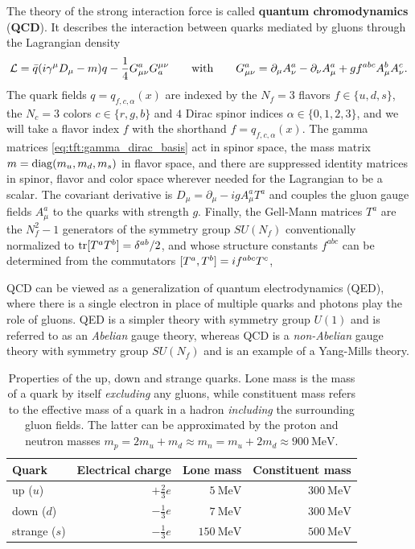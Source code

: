 The theory of the strong interaction force is called \textbf{quantum chromodynamics} (\textbf{QCD}).
It describes the interaction between quarks mediated by gluons through the Lagrangian density
\begin{equation}
	\mathcal{L} = \bar{q} ( i \gamma^\mu D_\mu - m ) q - \frac14 G_{\mu\nu}^a G^{\mu\nu}_a
	\qquad \text{with} \qquad
	G_{\mu\nu}^a = \partial_\mu A_\nu^a - \partial_\nu A_\mu^a + g f^{abc} A_\mu^b A_\nu^c.
\label{eq:qcd:lagrangian}
\end{equation}
The quark fields $q = q_{f,c,\alpha}(x)$ are indexed by
the $N_f = 3$ flavors $f \in \{u,d,s\}$,
the $N_c = 3$ colors $c \in \{r,g,b\}$ and
$4$ Dirac spinor indices $\alpha \in \{0,1,2,3\}$,
and we will take a flavor index $f$ with the shorthand $f = q_{f,c,\alpha}(x)$.
The gamma matrices \eqref{eq:tft:gamma_dirac_basis} act in spinor space,
the mass matrix $m = \operatorname{diag}(m_u, m_d, m_s)$ in flavor space,
and there are suppressed identity matrices in spinor, flavor and color space wherever needed for the Lagrangian to be a scalar.
The covariant derivative is $D_\mu = \partial_\mu - i g A_\mu^a T^a$ and couples the gluon gauge fields $A_\mu^a$ to the quarks with strength $g$.
Finally, the Gell-Mann matrices $T^a$ are the $N_f^2 - 1$ generators of the symmetry group $SU(N_f)$
conventionally normalized to $\operatorname{tr}[T^a T^b] = \delta^{ab}/2$,
and whose structure constants $f^{abc}$ can be determined from the commutators $[ T^a , T^b ] = i f^{abc} T^c$,

QCD can be viewed as a generalization of quantum electrodynamics (QED),
where there is a single electron in place of multiple quarks and photons play the role of gluons.
QED is a simpler theory with symmetry group $U(1)$ and is referred to as an \emph{Abelian} gauge theory,
whereas QCD is a \emph{non-Abelian} gauge theory with symmetry group $SU(N_f)$ and is an example of a Yang-Mills theory.

\begin{table}[b]
\centering
\caption{\label{tab:qcd:quark_properties}%
	Properties of the up, down and strange quarks.
	Lone mass is the mass of a quark by itself \emph{excluding} any gluons,
	while constituent mass refers to the effective mass of a quark in a hadron \emph{including} the surrounding gluon fields.
	The latter can be approximated by the proton and neutron masses $m_p = 2 m_u + m_d \approx m_n = m_u + 2 m_d \approx \SI{900}{\mega\electronvolt}$.
	\cite{ref:pdg_review_2021,ref:glendenning}
}
{ \renewcommand{\arraystretch}{1.2} %
\begin{tabular}{ l r r r }
	\toprule
	Quark & Electrical charge & Lone mass & Constituent mass \\
	\midrule
	up ($u$) & $+\frac23 e$ & $\SI{5}{\mega\electronvolt}$ & \approx \, $\SI{300}{\mega\electronvolt}$ \\
	down ($d$) & $-\frac13 e$ & $\SI{7}{\mega\electronvolt}$ & \approx \, $\SI{300}{\mega\electronvolt}$ \\
	strange ($s$) & $-\frac13 e$ & $\SI{150}{\mega\electronvolt}$ & \approx \, $\SI{500}{\mega\electronvolt}$ \\
	\bottomrule
\end{tabular} }
\end{table}

